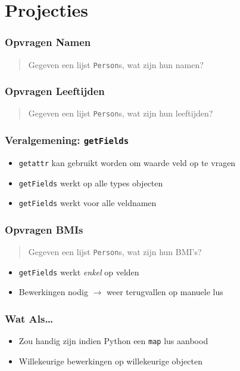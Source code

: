 \section{Projecties}

\frame{\tableofcontents[currentsection]}

\begin{frame}
  \frametitle{Opvragen Namen}
  \begin{quote}
    Gegeven een lijst \texttt{Person}s, wat zijn hun namen?
  \end{quote}
\end{frame}

\begin{frame}
  \frametitle{Opvragen Leeftijden}
  \begin{quote}
    Gegeven een lijst \texttt{Person}s, wat zijn hun leeftijden?
  \end{quote}
\end{frame}

\begin{frame}
  \frametitle{Veralgemening: \texttt{getFields}}
  \begin{itemize}
    \item \texttt{getattr} kan gebruikt worden om waarde veld op te vragen
    \item \texttt{getFields} werkt op alle types objecten
    \item \texttt{getFields} werkt voor alle veldnamen
  \end{itemize}
\end{frame}

\begin{frame}
  \frametitle{Opvragen BMIs}
  \begin{quote}
    Gegeven een lijst \texttt{Person}s, wat zijn hun BMI's?
  \end{quote}
  \begin{itemize}
    \item \texttt{getFields} werkt \emph{enkel} op velden
    \item Bewerkingen nodig $\rightarrow$ weer terugvallen op manuele lus
  \end{itemize}
\end{frame}

\begin{frame}
  \frametitle{Wat Als\dots}
  \begin{itemize}
    \item Zou handig zijn indien Python een {\tt map} lus aanbood
  \end{itemize}
  \begin{itemize}
    \item Willekeurige bewerkingen op willekeurige objecten
  \end{itemize}
\end{frame}